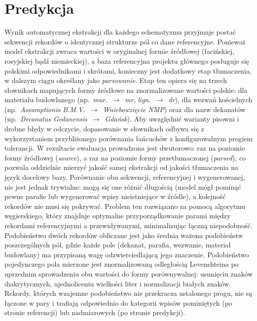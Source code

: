 \section{Predykcja}\label{sec:predykcja}

Wynik automatycznej ekstrakcji dla każdego schematyzmu przyjmuje postać sekwencji rekordów o identycznej strukturze pól co dane referencyjne.
Ponieważ model ekstrakcji zwraca wartości w oryginalnej formie źródłowej (łacińskiej, rosyjskiej bądź niemieckiej), a baza referencyjna projektu głównego posługuje się polskimi odpowiednikami i skrótami, konieczny jest dodatkowy etap tłumaczenia, w dalszym ciągu określany jako \textit{parsowanie}.
Etap ten opiera się na trzech słownikach mapujących formy źródłowe na znormalizowane wartości polskie: dla materiału budowlanego (np.\ \textit{mur.}~$\rightarrow$~\textit{mr}, \textit{lign.}~$\rightarrow$~\textit{dr}), dla wezwań kościelnych (np.\ \textit{Assumptionis B.M.V.}~$\rightarrow$~\textit{Wniebowzięcie NMP}) oraz dla nazw dekanatów (np.\ \textit{Decanatus Gedanensis}~$\rightarrow$~\textit{Gdańsk}).
Aby uwzględnić warianty pisowni i drobne błędy w odczycie, dopasowanie w słownikach odbywa się z wykorzystaniem przybliżonego porównania łańcuchów z konfigurowalnym progiem tolerancji.
W rezultacie ewaluacja prowadzona jest dwutorowo: raz na poziomie formy źródłowej (\textit{source}), a raz na poziomie formy przetłumaczonej (\textit{parsed}), co pozwala oddzielnie mierzyć jakość samej ekstrakcji od jakości tłumaczenia na język docelowy bazy.
Porównanie obu sekwencji, referencyjnej i wygenerowanej, nie jest jednak trywialne: mogą się one różnić długością (model mógł pominąć pewne parafie lub wygenerować wpisy nieistniejące w źródle), a kolejność rekordów nie musi się pokrywać.
Problem ten rozwiązano za pomocą algorytmu węgierskiego, który znajduje optymalne przyporządkowanie parami między rekordami referencyjnymi a przewidywanymi, minimalizując łączną niepodobność.
Podobieństwo dwóch rekordów obliczane jest jako średnia ważona podobieństw poszczególnych pól, gdzie każde pole (dekanat, parafia, wezwanie, materiał budowlany) ma przypisaną wagę odzwierciedlającą jego znaczenie.
Podobieństwo pojedynczego pola mierzone jest znormalizowaną odległością Levenshteina po uprzednim sprowadzeniu obu wartości do formy porównywalnej: usunięciu znaków diakrytycznych, ujednoliceniu wielkości liter i normalizacji białych znaków.
Rekordy, których wzajemne podobieństwo nie przekracza ustalonego progu, nie są łączone w pary i trafiają odpowiednio do kategorii wpisów pominiętych (po stronie referencji) lub nadmiarowych (po stronie predykcji).

